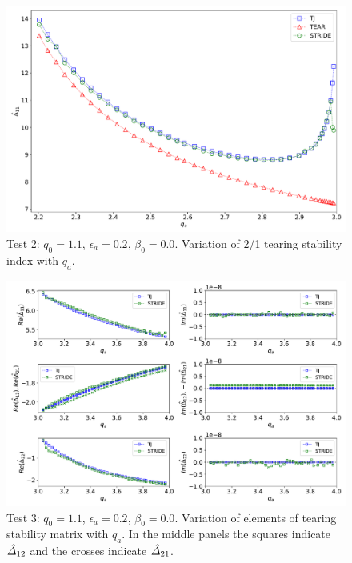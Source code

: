 \documentclass[12pt,prb,aps,notitlepage]{revtex4-1}
\begin{document}
\newpage
\begin{figure}
\centerline{\includegraphics[width=\textwidth]{Test2.pdf}}
\caption{Test 2: $q_0=1.1$, $\epsilon_a=0.2$, $\beta_0=0.0$. Variation of 2/1 tearing stability index with $q_a$. }
\end{figure}

\newpage
\begin{figure}
\centerline{\includegraphics[width=1.1\textwidth]{Test3.pdf}}
\caption{Test 3: $q_0=1.1$, $\epsilon_a=0.2$, $\beta_0=0.0$. Variation of elements of tearing stability matrix with $q_a$. In the middle panels the squares
indicate  $\hat{\mit\Delta}_{12}$ and the crosses indicate $\hat{\mit\Delta}_{21}$. }
\end{figure}
\end{document}

